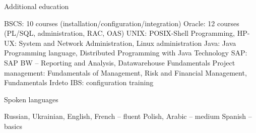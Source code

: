 \documentclass[10pt,a4paper]{extbook}
\begin{document}
Additional  education	

BSCS: 10 courses (installation/configuration/integration)
Oracle: 12 courses (PL/SQL, administration, RAC, OAS)
UNIX: POSIX-Shell Programming, HP-UX: System and Network Administration, Linux administration
Java: Java Programming language, Distributed Programming with Java Technology
SAP: SAP BW – Reporting and Analysis, Datawarehouse Fundamentals
Project management: Fundamentals of Management, Risk and Financial Management, Fundamentals
Irdeto IBS: configuration training

Spoken languages

Russian, Ukrainian, English, French – fluent
Polish, Arabic – medium
Spanish – basics
\end{document}
